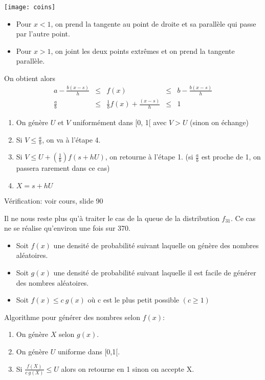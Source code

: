\begin{center}
\texttt{[image: coins]}
\end{center}

\begin{itemize}
	\item Pour $x<1$, on prend la tangente au point de droite et sa parallèle qui passe par l'autre point.
	\item Pour $x>1$, on joint les deux points extrêmes et on prend la tangente parallèle.
\end{itemize}

On obtient alors
\[
		\begin{aligned}
		a-\frac{b(x-s)}{h}&\leq& f(x) &\leq& b-\frac{b(x-s)}{h}\\
		\frac{a}{b} &\leq& \frac{1}{b}f(x)+\frac{(x-s)}{h} &\leq& 1
		\end{aligned}
\]

\begin{enumerate}
	\item On génère $U$ et $V$ uniformément dans [0, 1[ avec $V>U$ (sinon on échange)
	\item Si $V\leq \frac{a}{b}$, on va à l'étape 4.
	\item Si $V\leq U+(\frac{1}{b})f(s+hU)$, on retourne à l'étape 1. (si $\frac{a}{b}$ est proche de 1, on passera rarement dans ce cas)
	\item $X=s+hU$
\end{enumerate}

Vérification: voir cours, slide 90

Il ne nous reste plus qu'à traiter le cas de la queue de la distribution $f_{31}$. Ce cas ne se réalise qu'environ une fois sur 370.

\begin{itemize}
	\item Soit $f(x)$ une densité de probabilité suivant laquelle on génère des nombres aléatoires.
	\item Soit $g(x)$ une densité de probabilité suivant laquelle il est facile de générer des nombres aléatoires.
	\item Soit $f(x)\leq c\ g(x)$ où c est le plus petit possible $(c\geq 1)$
\end{itemize}

Algorithme pour générer des nombres selon $f(x)$:
\begin{enumerate}
	\item On génère $X$ selon $g(x)$.
	\item On génère $U$ uniforme dans [0,1[.
	\item Si $\frac{f(X)}{c\ g(X)}\leq U$ alors on retourne en 1 sinon on accepte X.
\end{enumerate}

